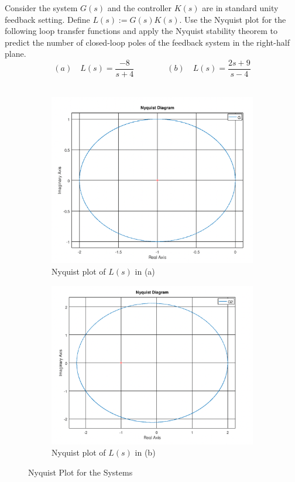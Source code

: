 \documentclass[12pt]{article}
\begin{document}
Consider the system $G(s)$ and the controller $K(s)$ are in standard unity feedback setting. Define $L(s) := G(s)K(s)$. Use the Nyquist plot for the following loop transfer functions and apply the Nyquist stability theorem to predict the number of closed-loop poles of the feedback system in the right-half plane.
$$(a) \quad L(s)=\frac{-8}{s+4} \qquad \qquad  (b) \quad L(s)=\frac{2s +9}{s-4}$$\\
\begin{figure}[H]
    \centering
    \begin{subfigure}[b]{0.45\textwidth}
    \centering
    \includegraphics[width=\textwidth]{figs/8.5-1.png}
     \caption{Nyquist plot of $L(s)$ in (a)}
     \end{subfigure}
     \begin{subfigure}[b]{0.46\textwidth}
     \centering
        \includegraphics[width=\textwidth]{figs/8.5-2.png}
     \caption{Nyquist plot of $L(s)$ in (b)}
     \end{subfigure}
    \caption{Nyquist Plot for the Systems}\label{fig:prb14}
\end{figure}
\end{document}
